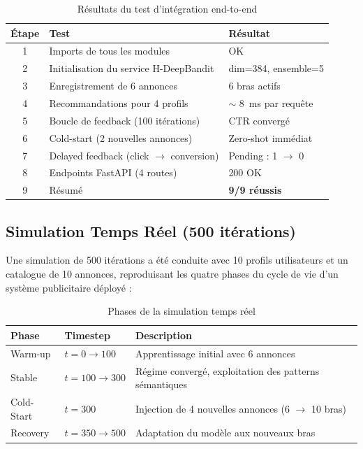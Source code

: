 \begin{table}
    
    \begin{tabular}{c l l}
        \hline
        \textbf{Étape} & \textbf{Test} & \textbf{Résultat} \\
        \hline
        1 & Imports de tous les modules            & OK \\
        2 & Initialisation du service H-DeepBandit & dim=384, ensemble=5 \\
        3 & Enregistrement de 6 annonces           & 6 bras actifs \\
        4 & Recommandations pour 4 profils         & $\sim$ 8~ms par requête \\
        5 & Boucle de feedback (100 itérations)     & CTR convergé \\
        6 & Cold-start (2 nouvelles annonces)       & Zero-shot immédiat \\
        7 & Delayed feedback (click $\to$ conversion)& Pending : 1 $\to$ 0 \\
        8 & Endpoints FastAPI (4 routes)            & 200 OK \\
        9 & Résumé                                 & \textbf{9/9 réussis} \\
        \hline
    \end{tabular}
    \caption{Résultats du test d'intégration end-to-end}
    \label{tab:integration_test}
\end{table}

\subsection{Simulation Temps Réel (500 itérations)}

Une simulation de 500 itérations a été conduite avec 10 profils utilisateurs et un catalogue de 10 annonces, reproduisant les quatre phases du cycle de vie d'un système publicitaire déployé :

\begin{table}
    
    \begin{tabular}{l l p{8cm}}
        \hline
        \textbf{Phase} & \textbf{Timestep} & \textbf{Description} \\
        \hline
        Warm-up       & $t = 0 \to 100$   & Apprentissage initial avec 6 annonces \\
        Stable        & $t = 100 \to 300$ & Régime convergé, exploitation des patterns sémantiques \\
        Cold-Start    & $t = 300$          & Injection de 4 nouvelles annonces (6 $\to$ 10 bras) \\
        Recovery      & $t = 350 \to 500$ & Adaptation du modèle aux nouveaux bras \\
        \hline
    \end{tabular}
    \caption{Phases de la simulation temps réel}
    \label{tab:phases_simulation}
\end{table}

